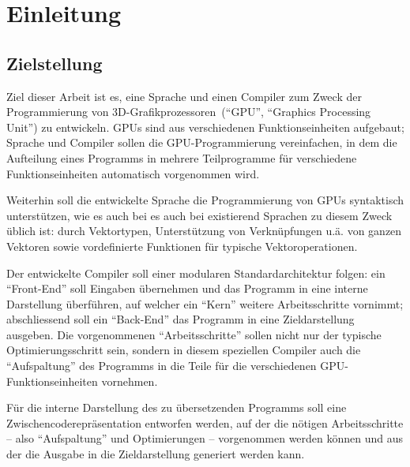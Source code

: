\documentclass[twoside,a4paper,fleqn,12pt]{book}
\begin{document}
\chapter{Einleitung}

\section{Zielstellung}

Ziel dieser Arbeit ist es, eine Sprache und einen Compiler zum Zweck der Programmierung von
3D-Grafikprozessoren~(``\gls{GPU}'', ``Graphics Processing Unit'') zu entwickeln.
GPUs sind aus verschiedenen Funktionseinheiten aufgebaut;
Sprache und Compiler sollen die GPU-Programmierung vereinfachen, in dem die Aufteilung eines Programms in mehrere Teilprogramme
für verschiedene Funktionseinheiten automatisch vorgenommen wird.

Weiterhin soll die entwickelte Sprache die Programmierung von GPUs syntaktisch unterstützen, wie es auch
bei es auch bei existierend Sprachen zu diesem Zweck üblich ist: durch Vektortypen, Unterstützung von Verknüpfungen
u.ä. von ganzen Vektoren sowie vordefinierte Funktionen für typische Vektoroperationen.


Der entwickelte Compiler soll einer modularen Standardarchitektur folgen: ein "`Front-End"' soll Eingaben übernehmen
und das Programm in eine interne Darstellung überführen, auf welcher ein "`Kern"' weitere Arbeitsschritte vornimmt;
abschliessend soll ein "`Back-End"' das Programm in eine Zieldarstellung ausgeben. Die vorgenommenen "`Arbeitsschritte"'
sollen nicht nur der typische Optimierungsschritt sein, sondern in diesem speziellen Compiler auch die "`Aufspaltung"'
des Programms in die Teile für die verschiedenen GPU-Funktionseinheiten vornehmen.

Für die interne Darstellung des zu übersetzenden Programms soll eine Zwischencoderepräsentation entworfen werden,
auf der die nötigen Arbeitsschritte -- also "`Aufspaltung"' und Optimierungen -- vorgenommen werden können
und aus der die Ausgabe in die Zieldarstellung generiert werden kann.


\end{document}
